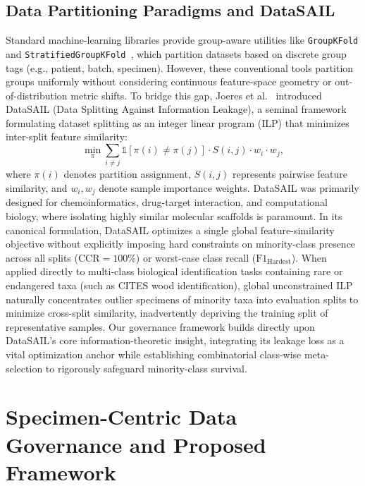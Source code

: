 \documentclass[a4paper,fleqn]{cas-sc}
\begin{document}
\subsection{Data Partitioning Paradigms and DataSAIL}
Standard machine-learning libraries provide group-aware utilities like \texttt{GroupKFold} and \texttt{StratifiedGroupKFold}~\cite{scikit}, which partition datasets based on discrete group tags (e.g., patient, batch, specimen). However, these conventional tools partition groups uniformly without considering continuous feature-space geometry or out-of-distribution metric shifts. To bridge this gap, Joeres et al.~\cite{joeres2025} introduced DataSAIL (Data Splitting Against Information Leakage), a seminal framework formulating dataset splitting as an integer linear program (ILP) that minimizes inter-split feature similarity:
\begin{equation}
\min_{\pi} \sum_{i \neq j} \mathbb{1}[\pi(i) \neq \pi(j)] \cdot S(i, j) \cdot w_i \cdot w_j,
\label{eq:datasail_objective}
\end{equation}
where $\pi(i)$ denotes partition assignment, $S(i,j)$ represents pairwise feature similarity, and $w_i, w_j$ denote sample importance weights. DataSAIL was primarily designed for chemoinformatics, drug-target interaction, and computational biology, where isolating highly similar molecular scaffolds is paramount. In its canonical formulation, DataSAIL optimizes a single global feature-similarity objective without explicitly imposing hard constraints on minority-class presence across all splits ($\mathrm{CCR} = 100\%$) or worst-case class recall ($\mathrm{F1}_{\text{Hardest}}$). When applied directly to multi-class biological identification tasks containing rare or endangered taxa (such as CITES wood identification), global unconstrained ILP naturally concentrates outlier specimens of minority taxa into evaluation splits to minimize cross-split similarity, inadvertently depriving the training split of representative samples. Our governance framework builds directly upon DataSAIL's core information-theoretic insight, integrating its leakage loss as a vital optimization anchor while establishing combinatorial class-wise meta-selection to rigorously safeguard minority-class survival.

\section{Specimen-Centric Data Governance and Proposed Framework}
\label{sec:governance}
\end{document}
